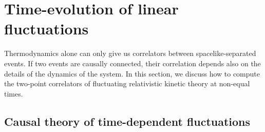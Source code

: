 \documentclass[aps,prd,preprint,nofootinbib,amsmath,amssymb,showpacs,longbibliography,singlecolumn,superscriptaddress,10pt]{revtex4-1}
\theoremstyle{plain}
\theoremstyle{definition}
\begin{document}
\section{Time-evolution of linear fluctuations}

Thermodynamics alone can only give us correlators between spacelike-separated events. If two events are causally connected, their correlation depends also on the details of the dynamics of the system. In this section, we discuss how to compute the two-point correlators of fluctuating relativistic kinetic theory at non-equal times.

\subsection{Causal theory of time-dependent fluctuations}\label{jarjar}
\end{document}
